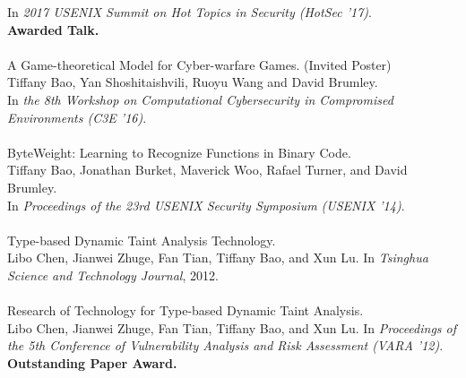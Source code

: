 \documentclass[11pt]{article}
\begin{document}
In \emph{2017 USENIX Summit on Hot Topics in Security (HotSec '17)}. \\
\textbf{Awarded Talk.}
\\\\
%
A Game-theoretical Model for Cyber-warfare Games. (Invited
Poster)\\
Tiffany Bao, Yan Shoshitaishvili, Ruoyu Wang and David
Brumley. \\
In \emph{the 8th Workshop on Computational Cybersecurity in
Compromised Environments (C3E '16)}.
\\\\
%
ByteWeight: Learning to Recognize Functions in Binary Code.
\\
Tiffany Bao, Jonathan Burket, Maverick Woo, Rafael Turner,
and David Brumley.  \\
In \emph{Proceedings of the 23rd USENIX Security Symposium
(USENIX '14)}.
\\\\
%
Type-based Dynamic Taint Analysis Technology. \\
Libo Chen, Jianwei Zhuge, Fan Tian, Tiffany Bao, and Xun Lu.
In \emph{Tsinghua Science and Technology Journal}, 2012.
\\\\
%
Research of Technology for Type-based Dynamic Taint Analysis. \\
Libo Chen, Jianwei Zhuge, Fan Tian, Tiffany Bao, and Xun Lu.
In \emph{Proceedings of the 5th Conference of Vulnerability Analysis
and Risk Assessment (VARA '12)}. \\
\textbf{Outstanding Paper Award.}


\end{document}
